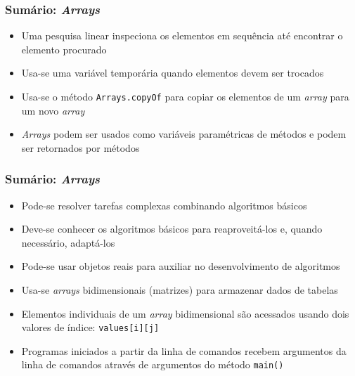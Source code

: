\documentclass[xcolor={dvipsnames,table},aspectratio=169]{beamer}
\begin{document}
\begin{frame}\frametitle{Sumário: \emph{Arrays}}
\begin{itemize}
	\item Uma pesquisa linear inspeciona os elementos em sequência até encontrar o elemento procurado
	\item Usa-se uma variável temporária quando elementos devem ser trocados
	\item Usa-se o método \texttt{Arrays.copyOf} para copiar os elementos de um \emph{array} para um novo \emph{array}
	\item \emph{Arrays} podem ser usados como variáveis paramétricas de métodos e podem ser retornados por métodos
\end{itemize}
\end{frame}

\begin{frame}\frametitle{Sumário: \emph{Arrays}}
\begin{itemize}
	\item Pode-se resolver tarefas complexas combinando algoritmos básicos
	\item Deve-se conhecer os algoritmos básicos para reaproveitá-los e, quando necessário, adaptá-los 
	\item Pode-se usar objetos reais para auxiliar no desenvolvimento de algoritmos
	\item Usa-se \emph{arrays} bidimensionais (matrizes) para armazenar dados de tabelas
	\item Elementos individuais de um \emph{array} bidimensional são acessados usando dois valores de índice: \texttt{values[i][j]}
	\item Programas iniciados a partir da linha de comandos recebem argumentos da linha de comandos através de argumentos do método \texttt{main()}
\end{itemize}
\end{frame}
\end{document}
